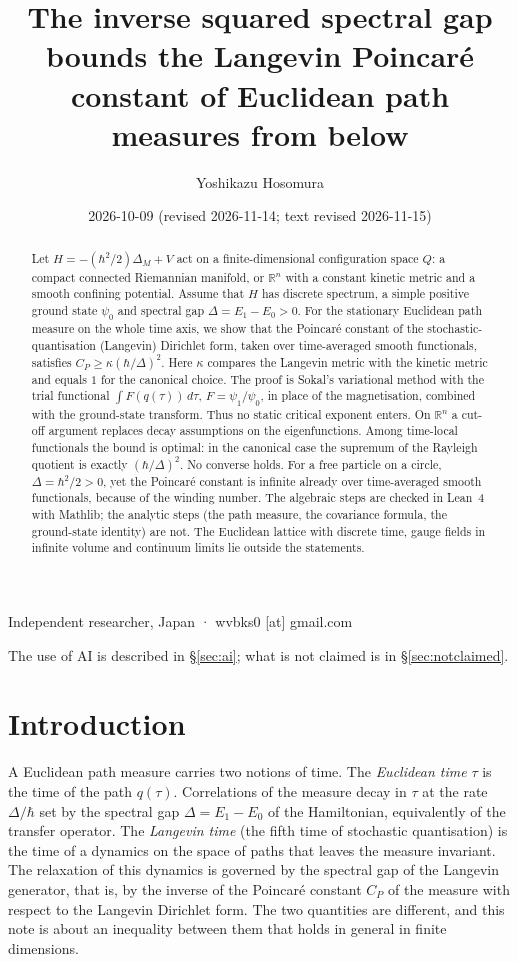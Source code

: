 \documentclass[11pt,a4paper]{article}
\title{The inverse squared spectral gap bounds the Langevin Poincar\'e constant of Euclidean path measures from below}
\author{Yoshikazu Hosomura}
\date{2026-10-09 (revised 2026-11-14; text revised 2026-11-15)}
\theoremstyle{definition}
\theoremstyle{remark}
\newcommand{\R}{\mathbb{R}}
\begin{document}
\maketitle
\begin{center}\small Independent researcher, Japan · wvbks0 [at] gmail.com\end{center}
\begin{center}\small The use of AI is described in \S\ref{sec:ai}; what is not claimed is in \S\ref{sec:notclaimed}.\end{center}

\begin{abstract}
Let $H=-(\hbar^2/2)\Delta_M+V$ act on a finite-dimensional configuration space $Q$: a compact connected Riemannian manifold, or $\R^n$ with a constant kinetic metric and a smooth confining potential.
Assume that $H$ has discrete spectrum, a simple positive ground state $\psi_0$ and spectral gap $\Delta=E_1-E_0>0$.
For the stationary Euclidean path measure on the whole time axis, we show that the Poincar\'e constant of the stochastic-quantisation (Langevin) Dirichlet form, taken over time-averaged smooth functionals, satisfies $C_P\ge\kappa(\hbar/\Delta)^2$.
Here $\kappa$ compares the Langevin metric with the kinetic metric and equals $1$ for the canonical choice.
The proof is Sokal's variational method with the trial functional $\int F(q(\tau))\,d\tau$, $F=\psi_1/\psi_0$, in place of the magnetisation, combined with the ground-state transform.
Thus no static critical exponent enters.
On $\R^n$ a cut-off argument replaces decay assumptions on the eigenfunctions.
Among time-local functionals the bound is optimal: in the canonical case the supremum of the Rayleigh quotient is exactly $(\hbar/\Delta)^2$.
No converse holds.
For a free particle on a circle, $\Delta=\hbar^2/2>0$, yet the Poincar\'e constant is infinite already over time-averaged smooth functionals, because of the winding number.
The algebraic steps are checked in Lean~4 with Mathlib; the analytic steps (the path measure, the covariance formula, the ground-state identity) are not.
The Euclidean lattice with discrete time, gauge fields in infinite volume and continuum limits lie outside the statements.
\end{abstract}

\section{Introduction}\label{sec:intro}

A Euclidean path measure carries two notions of time.
The \emph{Euclidean time} $\tau$ is the time of the path $q(\tau)$.
Correlations of the measure decay in $\tau$ at the rate $\Delta/\hbar$ set by the spectral gap $\Delta=E_1-E_0$ of the Hamiltonian, equivalently of the transfer operator.
The \emph{Langevin time} (the fifth time of stochastic quantisation) is the time of a dynamics on the space of paths that leaves the measure invariant.
The relaxation of this dynamics is governed by the spectral gap of the Langevin generator, that is, by the inverse of the Poincar\'e constant $C_P$ of the measure with respect to the Langevin Dirichlet form.
The two quantities are different, and this note is about an inequality between them that holds in general in finite dimensions.
\end{document}

